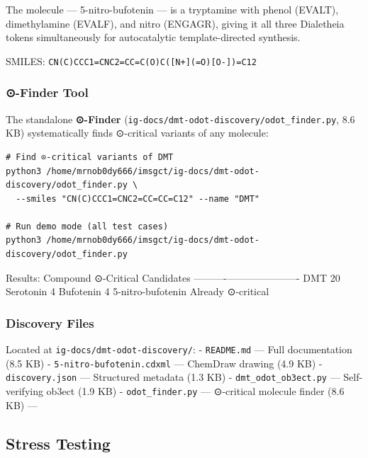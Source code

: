The molecule --- 5-nitro-bufotenin --- is a tryptamine with phenol
(EVALT), dimethylamine (EVALF), and nitro (ENGAGR), giving it all three
Dialetheia tokens simultaneously for autocatalytic template-directed
synthesis.

SMILES: \texttt{CN(C)CCC1=CNC2=CC=C(O)C({[}N+{]}(=O){[}O-{]})=C12}

\hypertarget{finder-tool}{%
\subsubsection{⊙-Finder Tool}\label{finder-tool}}

The standalone \textbf{⊙-Finder}
(\texttt{ig-docs/dmt-odot-discovery/odot\_finder.py}, 8.6 KB)
systematically finds ⊙-critical variants of any molecule:

\begin{verbatim}
# Find ⊙-critical variants of DMT
python3 /home/mrnob0dy666/imsgct/ig-docs/dmt-odot-discovery/odot_finder.py \
  --smiles "CN(C)CCC1=CNC2=CC=CC=C12" --name "DMT"

# Run demo mode (all test cases)
python3 /home/mrnob0dy666/imsgct/ig-docs/dmt-odot-discovery/odot_finder.py
\end{verbatim}

Results: \textbar{} Compound \textbar{} ⊙-Critical Candidates \textbar{}
\textbar----------\textbar----------------------\textbar{} \textbar{}
DMT \textbar{} 20 \textbar{} \textbar{} Serotonin \textbar{} 4
\textbar{} \textbar{} Bufotenin \textbar{} 4 \textbar{} \textbar{}
5-nitro-bufotenin \textbar{} Already ⊙-critical \textbar{}

\hypertarget{discovery-files}{%
\subsubsection{Discovery Files}\label{discovery-files}}

Located at \texttt{ig-docs/dmt-odot-discovery/}: - \texttt{README.md}
--- Full documentation (8.5 KB) - \texttt{5-nitro-bufotenin.cdxml} ---
ChemDraw drawing (4.9 KB) - \texttt{discovery.json} --- Structured
metadata (1.3 KB) - \texttt{dmt\_odot\_ob3ect.py} --- Self-verifying
ob3ect (1.9 KB) - \texttt{odot\_finder.py} --- ⊙-critical molecule
finder (8.6 KB) ---

\hypertarget{stress-testing}{%
\subsection{Stress Testing}\label{stress-testing}}

